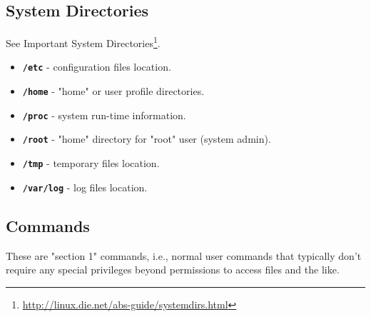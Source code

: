 \documentclass[10pt,american,]{book}
\renewcommand{\href}[2]{#2\footnote{\url{#1}}}
\numberwithin{figure}{chapter}
\begin{document}
\subsection*{System Directories}\label{system-directories}

See \href{http://linux.die.net/abs-guide/systemdirs.html}{Important
System Directories}.

\begin{itemize}
\item
  \textbf{\texttt{/etc}} - configuration files location.
\item
  \textbf{\texttt{/home}} - "home" or user profile directories.
\item
  \textbf{\texttt{/proc}} - system run-time information.
\item
  \textbf{\texttt{/root}} - "home" directory for "root" user (system
  admin). 
\item
  \textbf{\texttt{/tmp}} - temporary files location.
\item
  \textbf{\texttt{/var/log}} - log files location.
\end{itemize}

\subsection*{Commands}\label{commands}

These are "section 1" commands, i.e., normal user commands that
typically don't require any special privileges beyond permissions to
access files and the like.
\end{document}
